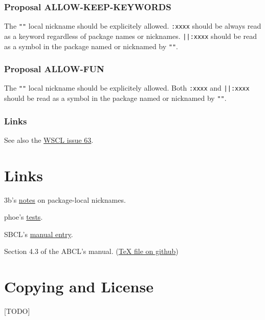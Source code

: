 \documentclass[11pt]{article}
\begin{document}
\subsubsection{Proposal ALLOW-KEEP-KEYWORDS}
\label{sec:orgda289e4}
The \texttt{""} local nickname should be explicitely allowed. \texttt{:xxxx} should be always
read as a keyword regardless of package names or nicknames. \texttt{||:xxxx} should be
read as a symbol in the package named or nicknamed by \texttt{""}.
\subsubsection{Proposal ALLOW-FUN}
\label{sec:org11c8bee}
The \texttt{""} local nickname should be explicitely allowed. Both \texttt{:xxxx} and \texttt{||:xxxx}
should be read as a symbol in the package named or nicknamed by \texttt{""}.
\subsubsection{Links}
\label{sec:org4eb41bc}
See also the \href{https://github.com/s-expressionists/wscl/issues/63}{WSCL issue 63}.
\section{Links}
\label{sec:orgdadaf33}
3b's \href{https://github.com/3b/package-local-nicknames/blob/master/docs.org}{notes} on package-local nicknames.

phoe's \href{https://github.com/phoe/trivial-package-local-nicknames}{tests}.

SBCL's \href{https://www.sbcl.org/manual/\#Package\_002dLocal-Nicknames}{manual entry}.

Section 4.3 of the ABCL's manual. (\href{https://github.com/armedbear/abcl/blob/master/doc/manual/abcl.tex\#L1249}{\TeX{} file on github})
\section{Copying and License}
\label{sec:orga8d180e}
[TODO]
\end{document}
